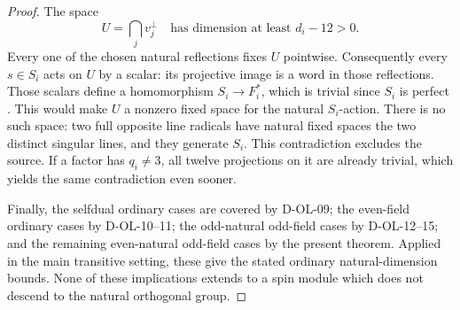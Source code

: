 \begin{proof}
The space
\[
                         U=\bigcap_j v_j^\perp
                         \quad\text{has dimension at least }d_i-12>0.
                         \tag{OE.22}
\]
Every one of the chosen natural reflections fixes $U$
pointwise.  Consequently every $s\in S_i$ acts on $U$
by a scalar: its projective image is a word in those
reflections.  Those scalars define a homomorphism
$S_i\to F_i^*$, which is trivial since $S_i$ is perfect
\cite[Theorems~11.47--11.48 and proofs, pp.~161--162]{OS:Taylor1992}.
This would make $U$ a nonzero fixed space for the natural
$S_i$-action.  There is no such space: two full opposite
line radicals have natural fixed spaces the two distinct
singular lines, and they generate $S_i$.
This contradiction excludes the source.  If a factor
has $q_i\ne3$, all twelve projections on it are already
trivial, which yields the same contradiction even sooner.

Finally, the selfdual ordinary cases are covered by
D-OL-09; the even-field ordinary cases by D-OL-10--11;
the odd-natural odd-field cases by D-OL-12--15; and the
remaining even-natural odd-field cases by the present
theorem.  Applied in the main transitive setting, these
give the stated ordinary natural-dimension bounds.
None of these implications extends to a spin module
which does not descend to the natural orthogonal group.
\end{proof}
